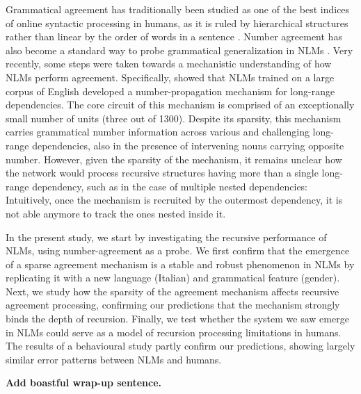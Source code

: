 Grammatical agreement has traditionally been studied as one of the
best indices of online syntactic processing in humans, as it is ruled
by hierarchical structures rather than linear by the order of words in
a sentence \citep{Bock:Miller:1991, franck2002subject}. Number
agreement has also become a standard way to probe grammatical
generalization in NLMs
\citep{Linzen:etal:2016,Bernardy:Lappin:2017,Giulianelli:etal:2018,Gulordava:etal:2018}. Very
recently, some steps were taken towards a mechanistic understanding of
how NLMs perform agreement. Specifically, \citet{lakretz2019emergence} showed that NLMs trained
on a large corpus of English developed a number-propagation mechanism for long-range dependencies. The core circuit of this mechanism is comprised of an exceptionally small number of units (three out of 1300). Despite its sparsity, this mechanism carries grammatical number information across various and challenging long-range dependencies, also in the presence of intervening nouns carrying opposite number. However, given the sparsity of the mechanism, it remains unclear how the network would
process recursive structures having more than a single long-range
dependency, such as in the case of multiple nested dependencies:
Intuitively, once the mechanism is recruited by the outermost
dependency, it is not able anymore to track the ones nested inside it.

In the present study, we start by investigating the recursive
performance of NLMs, using number-agreement as a
probe. We first confirm that the emergence of a sparse agreement mechanism is
a stable and robust phenomenon in NLMs by replicating it with a new
language (Italian) and grammatical feature (gender). Next, we study
how the sparsity of the agreement mechanism affects recursive
agreement processing, confirming our predictions that the mechanism
strongly binds the depth of recursion. Finally, we test whether the
 system we saw emerge in NLMs could serve as a
model of recursion processing limitations in humans. The results of a
behavioural study partly confirm our predictions, showing largely similar error patterns between NLMs and humans. 

\textbf{Add boastful wrap-up sentence.}
